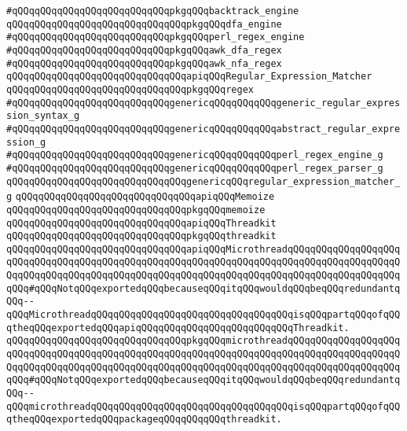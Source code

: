 \verb|#qQQqqQQqqQQqqQQqqQQqqQQqqQQqpkgqQQqbacktrack_engine|\newline
\verb|qQQqqQQqqQQqqQQqqQQqqQQqqQQqqQQqpkgqQQqdfa_engine|\newline
\verb|#qQQqqQQqqQQqqQQqqQQqqQQqqQQqpkgqQQqperl_regex_engine|\newline
\verb|#qQQqqQQqqQQqqQQqqQQqqQQqqQQqpkgqQQqawk_dfa_regex|\newline
\verb|#qQQqqQQqqQQqqQQqqQQqqQQqqQQqpkgqQQqawk_nfa_regex|\newline
\verb|qQQqqQQqqQQqqQQqqQQqqQQqqQQqqQQqapiqQQqRegular_Expression_Matcher|\newline
\verb|qQQqqQQqqQQqqQQqqQQqqQQqqQQqqQQqpkgqQQqregex|\newline
\newline
\verb|#qQQqqQQqqQQqqQQqqQQqqQQqqQQqgenericqQQqqQQqqQQqgeneric_regular_expression_syntax_g|\newline
\verb|#qQQqqQQqqQQqqQQqqQQqqQQqqQQqgenericqQQqqQQqqQQqabstract_regular_expression_g|\newline
\verb|#qQQqqQQqqQQqqQQqqQQqqQQqqQQqgenericqQQqqQQqqQQqperl_regex_engine_g|\newline
\verb|#qQQqqQQqqQQqqQQqqQQqqQQqqQQqgenericqQQqqQQqqQQqperl_regex_parser_g|\newline
\newline
\verb|qQQqqQQqqQQqqQQqqQQqqQQqqQQqqQQqgenericqQQqregular_expression_matcher_g|\newline
\newline
\newline
\verb|qQQqqQQqqQQqqQQqqQQqqQQqqQQqqQQqapiqQQqMemoize|\newline
\verb|qQQqqQQqqQQqqQQqqQQqqQQqqQQqqQQqpkgqQQqmemoize|\newline
\newline
\verb|qQQqqQQqqQQqqQQqqQQqqQQqqQQqqQQqapiqQQqThreadkit|\newline
\verb|qQQqqQQqqQQqqQQqqQQqqQQqqQQqqQQqpkgqQQqthreadkit|\newline
\newline
\verb|qQQqqQQqqQQqqQQqqQQqqQQqqQQqqQQqapiqQQqMicrothreadqQQqqQQqqQQqqQQqqQQqqQQqqQQqqQQqqQQqqQQqqQQqqQQqqQQqqQQqqQQqqQQqqQQqqQQqqQQqqQQqqQQqqQQqqQQqqQQqqQQqqQQqqQQqqQQqqQQqqQQqqQQqqQQqqQQqqQQqqQQqqQQqqQQqqQQqqQQqqQQqqQQq#qQQqNotqQQqexportedqQQqbecauseqQQqitqQQqwouldqQQqbeqQQqredundantqQQq--qQQqMicrothreadqQQqqQQqqQQqqQQqqQQqqQQqqQQqqQQqqQQqisqQQqpartqQQqofqQQqtheqQQqexportedqQQqapiqQQqqQQqqQQqqQQqqQQqqQQqqQQqThreadkit.|\newline
\verb|qQQqqQQqqQQqqQQqqQQqqQQqqQQqqQQqpkgqQQqmicrothreadqQQqqQQqqQQqqQQqqQQqqQQqqQQqqQQqqQQqqQQqqQQqqQQqqQQqqQQqqQQqqQQqqQQqqQQqqQQqqQQqqQQqqQQqqQQqqQQqqQQqqQQqqQQqqQQqqQQqqQQqqQQqqQQqqQQqqQQqqQQqqQQqqQQqqQQqqQQqqQQqqQQq#qQQqNotqQQqexportedqQQqbecauseqQQqitqQQqwouldqQQqbeqQQqredundantqQQq--qQQqmicrothreadqQQqqQQqqQQqqQQqqQQqqQQqqQQqqQQqqQQqisqQQqpartqQQqofqQQqtheqQQqexportedqQQqpackageqQQqqQQqqQQqthreadkit.|\newline
